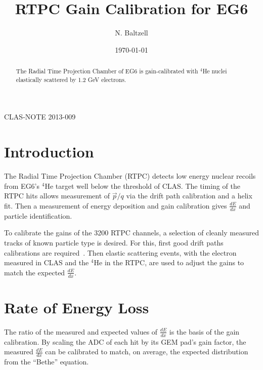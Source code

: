 \documentclass[amsmath,amssymb,notitlepage,12pt]{revtex4-1}
\begin{document}
\hspace*{11.5cm}CLAS-NOTE 2013-009


\title{RTPC Gain Calibration for EG6}
\author{N. Baltzell}
\date{\today}
\begin{abstract}
The Radial Time Projection Chamber of EG6 is gain-calibrated with $^4$He nuclei elastically scattered by 1.2 GeV electrons.
\end{abstract}
\maketitle
\tableofcontents

\section{Introduction}
The Radial Time Projection Chamber (RTPC) detects low energy nuclear recoils from EG6's $^4$He target well below the threshold of CLAS.  The timing of the RTPC hits allows measurement of $\vec{p}/q$ via the drift path calibration and a helix fit.  Then a measurement of energy deposition and gain calibration gives $\frac{dE}{dx}$ and particle identification.

To calibrate the gains of the 3200 RTPC channels, a selection of cleanly measured tracks of known particle type is desired.  For this, first good drift paths calibrations are required~\cite{driftpaths}.  Then elastic scattering events, with the electron measured in CLAS and the $^4$He in the RTPC, are used to adjust the gains to match the expected $\frac{dE}{dx}$.

\section{Rate of Energy Loss}
The ratio of the measured and expected values of $\frac{dE}{dx}$ is the basis of the gain calibration.  By scaling the ADC of each hit by its GEM pad's gain factor, the measured $\frac{dE}{dx}$ can be calibrated to match, on average, the expected distribution from the ``Bethe'' equation. %

\end{document}
